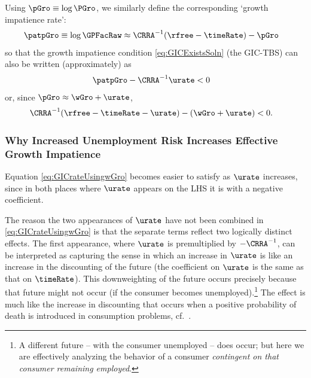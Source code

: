 \documentclass{handout}
\begin{document}
Using $\pGro \equiv \log \PGro$, we similarly define the corresponding `growth impatience rate':
\begin{equation}\begin{gathered}\begin{aligned}
  \patpGro & \equiv  \log \GPFacRaw \approx \CRRA^{-1}(\rfree-\timeRate) - \pGro
\end{aligned}\end{gathered}\end{equation}
so that the growth impatience condition \eqref{eq:GICExistsSoln} (the GIC-TBS) can also be written (approximately) as
\begin{equation}\begin{gathered}\begin{aligned}
  \patpGro - \CRRA^{-1}\urate & <  0   \label{eq:GICrateUsingpGro}
\end{aligned}\end{gathered}\end{equation}
or, since $\pGro \approx \wGro+\urate$, 
\begin{equation}\begin{gathered}\begin{aligned}
 \CRRA^{-1}(\rfree-\timeRate-\urate)-(\wGro+\urate) & <  0 \label{eq:GICrateUsingwGro}
.
\end{aligned}\end{gathered}\end{equation}

\subsubsection{Why Increased Unemployment Risk Increases Effective Growth Impatience}

Equation \eqref{eq:GICrateUsingwGro} becomes easier to satisfy as $\urate$ increases, since 
in both places where $\urate$ appears on the LHS it is with a negative coefficient.

The reason the two appearances of $\urate$ have not been combined in \eqref{eq:GICrateUsingwGro} is that the separate 
terms reflect two logically distinct effects.  The first appearance, where $\urate$ is premultiplied by $-\CRRA^{-1}$, 
can be interpreted as capturing the sense in which an increase in $\urate$ is like an increase in the discounting of the future (the
coefficient on $\urate$ is the same as that on $\timeRate$).  This downweighting of the future occurs precisely because that future
might not occur (if the consumer becomes unemployed).\footnote{A different future -- with the consumer unemployed -- does occur; but here we are effectively analyzing the behavior of a consumer {\it contingent on that consumer remaining employed}.}  The effect is much like the increase in discounting that occurs 
when a positive probability of death is introduced in consumption problems, cf.~\cite{blanchardFinite}.
\end{document}
